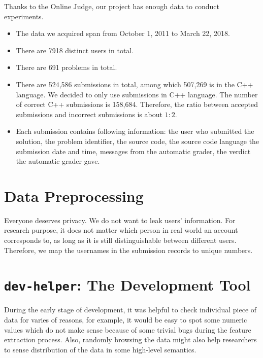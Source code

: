     Thanks to the Online Judge, our project has enough data to conduct experiments.

    \begin{itemize}
        \item The data we acquired span from October 1, 2011 to March 22, 2018.
        \item There are 7918 distinct users in total.
        \item There are 691 problems in total.
        \item There are 524,586 submissions in total, among which 507,269 is in the C++ language.
            We decided to only use submissions in C++ language.
            The number of correct C++ submissions is 158,684.
            Therefore, the ratio between accepted submissions and incorrect submissions is about $1:2$.
        \item Each submission contains following information:
            the user who submitted the solution,
            the problem identifier,
            the source code,
            the source code language
            the submission date and time,
            messages from the automatic grader,
            the verdict the automatic grader gave.
    \end{itemize}

\section{Data Preprocessing}

    Everyone deserves privacy. We do not want to leak users' information.
    For research purpose, it does not matter which person in real world an account corresponds to,
    as long as it is still distinguishable between different users.
    Therefore, we map the usernames in the submission records to unique numbers.


\section{\texttt{dev-helper}: The Development Tool}

    During the early stage of development,
    it was helpful to check individual piece of data for varies of reasons,
    for example, it would be easy to spot some numeric values which do not make sense
    because of some trivial bugs during the feature extraction process.
    Also, randomly browsing the data might also help researchers to sense distribution of the data
    in some high-level semantics.

